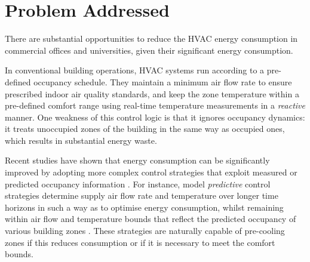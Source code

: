 \section{Problem Addressed}
\label{sec:problemstatement}
 
There are substantial opportunities to reduce the HVAC energy consumption in commercial offices and universities, given their significant energy consumption. %

In conventional building operations, HVAC systems run according to a pre-defined occupancy schedule. They maintain a minimum air flow rate to ensure prescribed indoor air quality standards, and keep the zone temperature within a pre-defined comfort range using real-time temperature measurements in a {\em reactive} manner. One weakness of this control logic is that it ignores occupancy dynamics: it treats unoccupied zones of the building in the same way as occupied ones, which results in substantial energy waste.

Recent studies have shown that energy consumption can be significantly improved by adopting more complex control strategies that exploit measured or predicted occupancy information \citep{agarwal2010occupancy, erickson2010occupancy, erickson2009energy, goyal2013energy, goyal2013occupancy, west2014trial}. For instance, model {\em predictive} control strategies determine supply air flow rate and temperature over longer time horizons in such a way as to optimise energy consumption, whilst remaining within air flow and temperature bounds that reflect the predicted occupancy of various building zones \citep{goyal2013occupancy}. These strategies are naturally capable of pre-cooling zones if this reduces consumption or if it is necessary to meet the comfort bounds. %

